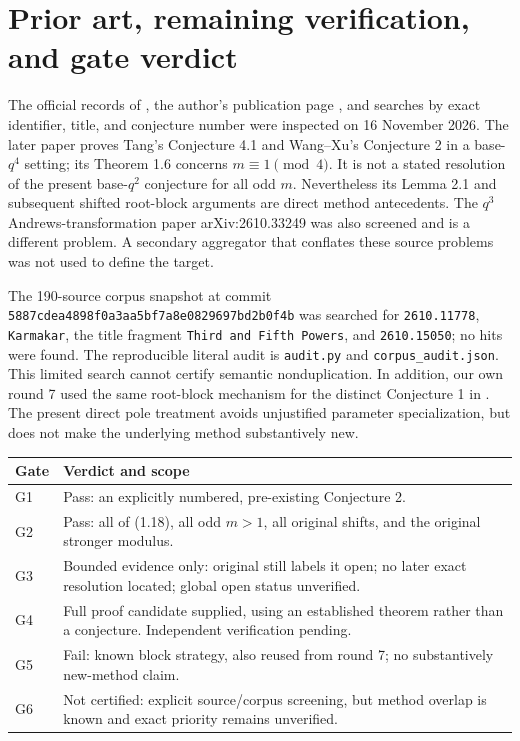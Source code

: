 \documentclass[11pt,a4paper]{article}
\begin{document}
\section{Prior art, remaining verification, and gate verdict}
The official records of \cite{KJ,G2}, the author's publication page
\cite{Jana}, and searches by exact identifier, title, and conjecture number
were inspected on 16 November 2026. The later paper \cite{G2} proves
Tang's Conjecture 4.1 and Wang--Xu's Conjecture 2 in a base-$q^4$ setting;
its Theorem 1.6 concerns $m\equiv1\pmod4$. It is not a stated resolution
of the present base-$q^2$ conjecture for all odd $m$. Nevertheless its
Lemma 2.1 and subsequent shifted root-block arguments are direct method
antecedents. The $q^3$ Andrews-transformation paper arXiv:2610.33249 was
also screened and is a different problem. A secondary aggregator that
conflates these source problems was not used to define the target.

The 190-source corpus snapshot at commit
\texttt{5887cdea4898f0a3aa5bf7a8e0829697bd2b0f4b} was searched for
\texttt{2610.11778}, \texttt{Karmakar}, the title fragment
\texttt{Third and Fifth Powers}, and \texttt{2610.15050}; no hits were
found. The reproducible literal audit is \texttt{audit.py} and
\texttt{corpus\_audit.json}. This limited search cannot certify semantic
nonduplication. In addition, our own round 7 used the same root-block
mechanism for the distinct Conjecture 1 in \cite{KJ}. The present direct
pole treatment avoids unjustified parameter specialization, but does not
make the underlying method substantively new.

\begin{center}\small
\begin{tabular}{p{.09\linewidth}p{.82\linewidth}}
\toprule
Gate&Verdict and scope\\\midrule
G1&Pass: an explicitly numbered, pre-existing Conjecture 2.\\
G2&Pass: all of (1.18), all odd $m>1$, all original shifts, and the original stronger modulus.\\
G3&Bounded evidence only: original still labels it open; no later exact resolution located; global open status unverified.\\
G4&Full proof candidate supplied, using an established theorem rather than a conjecture. Independent verification pending.\\
G5&Fail: known block strategy, also reused from round 7; no substantively new-method claim.\\
G6&Not certified: explicit source/corpus screening, but method overlap is known and exact priority remains unverified.\\\bottomrule
\end{tabular}
\end{center}
\end{document}
